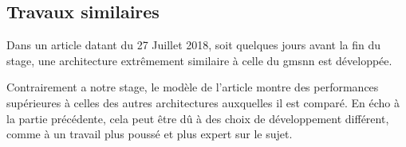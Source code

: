 \subsection{Travaux similaires}
Dans un article datant du 27 Juillet 2018, soit quelques jours avant la fin du stage, une architecture extrêmement similaire à celle du \gls{gmsnn} est développée.

Contrairement a notre stage, le modèle de l'article montre des performances supérieures à celles des autres architectures auxquelles il est comparé.
En écho à la partie précédente, cela peut être dû à des choix de développement différent, comme à un travail plus poussé et plus expert sur le sujet.


